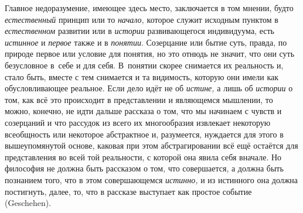 Главное недоразумение, имеющее здесь место, заключается в том
мнении, будто {\em естественный} принцип или то {\em начало,} которое
служит исходным пунктом в {\em естественном} развитии или в {\em истории}
развивающегося индивидуума, есть {\em истинное} и {\em первое} также и в
{\em понятии}. Созерцание
или бытие суть, правда, по природе первое или условие для понятия, но это
отнюдь не значит, что они суть безусловное в~себе и для себя. В~понятии
скорее снимается их реальность и, стало быть, вместе с тем снимается и та
видимость, которую они имели как обусловливающее реальное. Если дело идёт
не об {\em истине,} а лишь об {\em истории} о
том, как всё это происходит в представлении и являющемся мышлении, то
можно, конечно, не идти дальше рассказа о том, что мы начинаем с чувств и
созерцаний и что рассудок из всего их многообразия извлекает некоторую
всеобщность или некоторое абстрактное и, разумеется, нуждается для этого в
вышеупомянутой основе, каковая при этом абстрагировании всё ещё остаётся
для представления во всей той реальности, с которой она явила себя вначале.
Но философия не должна быть рассказом о том, что совершается, а должна быть
познанием того, что в этом совершающемся {\em истинно,} и из
истинного она должна постигнуть, далее, то, что в рассказе выступает как
простое событие (Geschehen).

